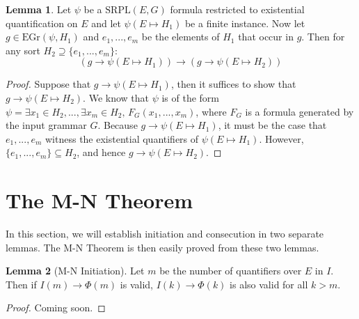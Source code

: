 \documentclass[12pt]{article}
\theoremstyle{definition}
\newtheorem{lemma}{Lemma}
\theoremstyle{remark}
\newcommand{\gr}{\text{EGr}}
\newcommand{\SRPL}{\text{SRPL}}
\begin{document}
\begin{lemma}
  \label{lem:exists-lower}
  Let $\psi$ be a $\SRPL(E,G)$ formula restricted to existential quantification on $E$ and let $\psi(E \mapsto H_1)$ be a finite instance.  Now let $g \in \gr(\psi,H_1)$ and $e_1,...,e_m$ be the elements of $H_1$ that occur in $g$.  Then for any sort $H_2 \supseteq \{e_1,...,e_m\}$:
  $$(g \rightarrow \psi(E \mapsto H_1)) \rightarrow (g \rightarrow \psi(E \mapsto H_2))$$
\end{lemma}
\begin{proof}
  Suppose that $g \rightarrow \psi(E \mapsto H_1)$, then it suffices to show that $g \rightarrow \psi(E \mapsto H_2)$.  We know that $\psi$ is of the form $\psi = \exists x_1 \in H_2,...,\exists x_m \in H_2, \, F_G(x_1,...,x_m)$, where $F_G$ is a formula generated by the input grammar $G$.  Because $g \rightarrow \psi(E \mapsto H_1)$, it must be the case that $e_1,...,e_m$ witness the existential quantifiers of $\psi(E \mapsto H_1)$.  However, $\{e_1,...,e_m\} \subseteq H_2$, and hence $g \rightarrow \psi(E \mapsto H_2)$.
\end{proof}



\section{The M-N Theorem}

In this section, we will establish initiation and consecution in two separate lemmas.  The M-N Theorem is then easily proved from these two lemmas.

\begin{lemma}[M-N Initiation]
  \label{ref:initiation}
  Let $m$ be the number of quantifiers over $E$ in $I$.  Then if $I(m) \rightarrow \Phi(m)$ is valid, $I(k) \rightarrow \Phi(k)$ is also valid for all $k>m$.
\end{lemma}
\begin{proof}
  Coming soon.
\end{proof}
\end{document}
